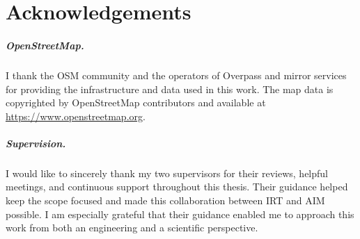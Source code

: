 





































\chapter{Acknowledgements}%
\label{chap:acknowledgements}

\paragraph{OpenStreetMap.} %
I thank the \ac{OSM} community and the operators of Overpass and mirror services for providing the infrastructure and data used in this work. %
The map data is copyrighted by OpenStreetMap contributors and available at \url{https://www.openstreetmap.org}.

\paragraph{Supervision.}

I would like to sincerely thank my two supervisors for their reviews, helpful meetings, and continuous support throughout this thesis.
Their guidance helped keep the scope focused and made this collaboration between IRT and AIM possible. I am especially grateful that their guidance enabled me to approach this work from both an engineering and a scientific perspective.

